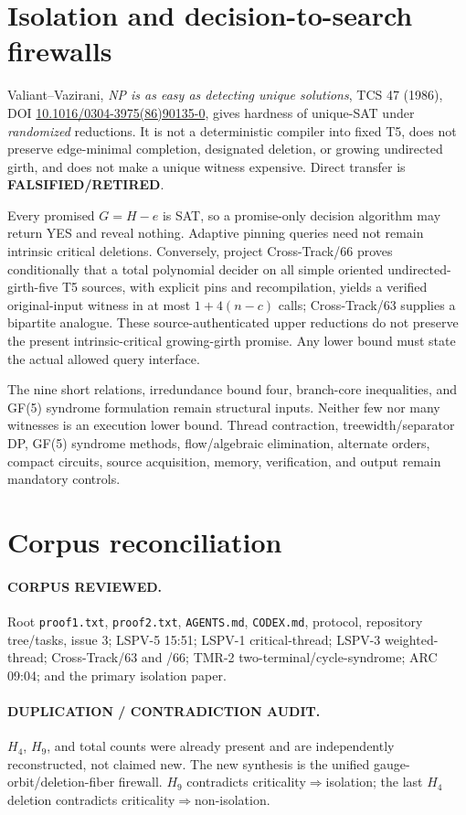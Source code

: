 \documentclass[11pt]{article}
\begin{document}
\section{Isolation and decision-to-search firewalls}
Valiant--Vazirani, \emph{NP is as easy as detecting unique solutions}, TCS 47 (1986), DOI \href{https://doi.org/10.1016/0304-3975(86)90135-0}{10.1016/0304-3975(86)90135-0}, gives hardness of unique-SAT under \emph{randomized} reductions.  It is not a deterministic compiler into fixed T5, does not preserve edge-minimal completion, designated deletion, or growing undirected girth, and does not make a unique witness expensive.  Direct transfer is \textbf{FALSIFIED/RETIRED}.

Every promised $G=H-e$ is SAT, so a promise-only decision algorithm may return YES and reveal nothing.  Adaptive pinning queries need not remain intrinsic critical deletions.  Conversely, project Cross-Track/66 proves conditionally that a total polynomial decider on all simple oriented undirected-girth-five T5 sources, with explicit pins and recompilation, yields a verified original-input witness in at most $1+4(n-c)$ calls; Cross-Track/63 supplies a bipartite analogue.  These source-authenticated upper reductions do not preserve the present intrinsic-critical growing-girth promise.  Any lower bound must state the actual allowed query interface.

The nine short relations, irredundance bound four, branch-core inequalities, and GF(5) syndrome formulation remain structural inputs.  Neither few nor many witnesses is an execution lower bound.  Thread contraction, treewidth/separator DP, GF(5) syndrome methods, flow/algebraic elimination, alternate orders, compact circuits, source acquisition, memory, verification, and output remain mandatory controls.

\section{Corpus reconciliation}
\paragraph{CORPUS REVIEWED.} Root \texttt{proof1.txt}, \texttt{proof2.txt}, \texttt{AGENTS.md}, \texttt{CODEX.md}, protocol, repository tree/tasks, issue 3; LSPV-5 15:51; LSPV-1 critical-thread; LSPV-3 weighted-thread; Cross-Track/63 and /66; TMR-2 two-terminal/cycle-syndrome; ARC 09:04; and the primary isolation paper.

\paragraph{DUPLICATION / CONTRADICTION AUDIT.} $H_4$, $H_9$, and total counts were already present and are independently reconstructed, not claimed new.  The new synthesis is the unified gauge-orbit/deletion-fiber firewall.  $H_9$ contradicts criticality$\Rightarrow$isolation; the last $H_4$ deletion contradicts criticality$\Rightarrow$non-isolation.
\end{document}
